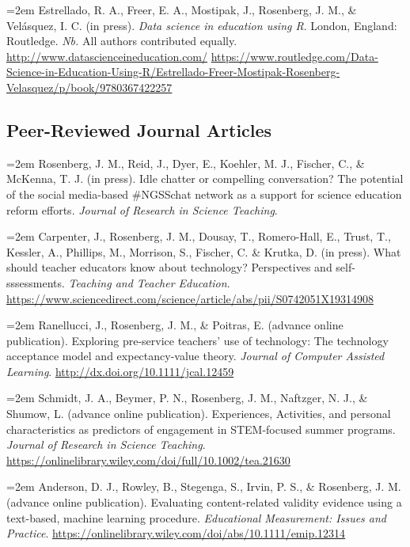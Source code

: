 \documentclass[
  11pt,
]{article}
\begin{document}
\hangindent=2em Estrellado, R. A., Freer, E. A., Mostipak, J.,
Rosenberg, J. M., \& Velásquez, I. C. (in press). \emph{Data science in
education using R}. London, England: Routledge. \emph{Nb.} All authors
contributed equally. \url{http://www.datascienceineducation.com/}
\url{https://www.routledge.com/Data-Science-in-Education-Using-R/Estrellado-Freer-Mostipak-Rosenberg-Velasquez/p/book/9780367422257}

\hypertarget{peer-reviewed-journal-articles}{%
\subsection{Peer-Reviewed Journal
Articles}\label{peer-reviewed-journal-articles}}

\hangindent=2em Rosenberg, J. M., Reid, J., Dyer, E., Koehler, M. J.,
Fischer, C., \& McKenna, T. J. (in press). Idle chatter or compelling
conversation? The potential of the social media-based \#NGSSchat network
as a support for science education reform efforts. \emph{Journal of
Research in Science Teaching}.

\hangindent=2em Carpenter, J., Rosenberg, J. M., Dousay, T.,
Romero-Hall, E., Trust, T., Kessler, A., Phillips, M., Morrison, S.,
Fischer, C. \& Krutka, D. (in press). What should teacher educators know
about technology? Perspectives and self-sssessments. \emph{Teaching and
Teacher Education}.
\url{https://www.sciencedirect.com/science/article/abs/pii/S0742051X19314908}

\hangindent=2em Ranellucci, J., Rosenberg, J. M., \& Poitras, E.
(advance online publication). Exploring pre-service teachers' use of
technology: The technology acceptance model and expectancy-value theory.
\emph{Journal of Computer Assisted Learning}.
\url{http://dx.doi.org/10.1111/jcal.12459}

\hangindent=2em Schmidt, J. A., Beymer, P. N., Rosenberg, J. M.,
Naftzger, N. J., \& Shumow, L. (advance online publication).
Experiences, Activities, and personal characteristics as predictors of
engagement in STEM-focused summer programs. \emph{Journal of Research in
Science Teaching}.
\url{https://onlinelibrary.wiley.com/doi/full/10.1002/tea.21630}

\hangindent=2em Anderson, D. J., Rowley, B., Stegenga, S., Irvin, P. S.,
\& Rosenberg, J. M. (advance online publication). Evaluating
content-related validity evidence using a text-based, machine learning
procedure. \emph{Educational Measurement: Issues and Practice}.
\url{https://onlinelibrary.wiley.com/doi/abs/10.1111/emip.12314}
\end{document}
